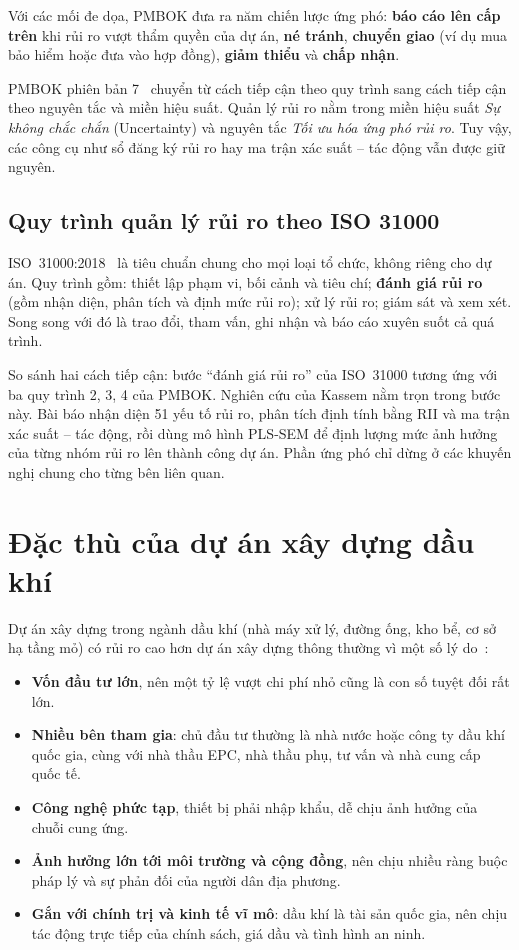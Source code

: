 Với các mối đe dọa, PMBOK đưa ra năm chiến lược ứng phó: \textbf{báo cáo lên cấp trên} khi rủi ro vượt thẩm quyền của dự án, \textbf{né tránh}, \textbf{chuyển giao} (ví dụ mua bảo hiểm hoặc đưa vào hợp đồng), \textbf{giảm thiểu} và \textbf{chấp nhận}.

PMBOK phiên bản 7~\cite{pmbok7} chuyển từ cách tiếp cận theo quy trình sang cách tiếp cận theo nguyên tắc và miền hiệu suất. Quản lý rủi ro nằm trong miền hiệu suất \emph{Sự không chắc chắn} (Uncertainty) và nguyên tắc \emph{Tối ưu hóa ứng phó rủi ro}. Tuy vậy, các công cụ như sổ đăng ký rủi ro hay ma trận xác suất -- tác động vẫn được giữ nguyên.

\subsection{Quy trình quản lý rủi ro theo ISO 31000}

ISO~31000:2018~\cite{iso31000} là tiêu chuẩn chung cho mọi loại tổ chức, không riêng cho dự án. Quy trình gồm: thiết lập phạm vi, bối cảnh và tiêu chí; \textbf{đánh giá rủi ro} (gồm nhận diện, phân tích và định mức rủi ro); xử lý rủi ro; giám sát và xem xét. Song song với đó là trao đổi, tham vấn, ghi nhận và báo cáo xuyên suốt cả quá trình.

So sánh hai cách tiếp cận: bước ``đánh giá rủi ro'' của ISO~31000 tương ứng với ba quy trình 2, 3, 4 của PMBOK. Nghiên cứu của Kassem nằm trọn trong bước này. Bài báo nhận diện 51 yếu tố rủi ro, phân tích định tính bằng RII và ma trận xác suất -- tác động, rồi dùng mô hình PLS-SEM để định lượng mức ảnh hưởng của từng nhóm rủi ro lên thành công dự án. Phần ứng phó chỉ dừng ở các khuyến nghị chung cho từng bên liên quan.

\section{Đặc thù của dự án xây dựng dầu khí}
\label{sec:dau-khi}

Dự án xây dựng trong ngành dầu khí (nhà máy xử lý, đường ống, kho bể, cơ sở hạ tầng mỏ) có rủi ro cao hơn dự án xây dựng thông thường vì một số lý do~\cite{kassem2022,thuyet2007}:
\begin{itemize}
  \item \textbf{Vốn đầu tư lớn}, nên một tỷ lệ vượt chi phí nhỏ cũng là con số tuyệt đối rất lớn.
  \item \textbf{Nhiều bên tham gia}: chủ đầu tư thường là nhà nước hoặc công ty dầu khí quốc gia, cùng với nhà thầu EPC, nhà thầu phụ, tư vấn và nhà cung cấp quốc tế.
  \item \textbf{Công nghệ phức tạp}, thiết bị phải nhập khẩu, dễ chịu ảnh hưởng của chuỗi cung ứng.
  \item \textbf{Ảnh hưởng lớn tới môi trường và cộng đồng}, nên chịu nhiều ràng buộc pháp lý và sự phản đối của người dân địa phương.
  \item \textbf{Gắn với chính trị và kinh tế vĩ mô}: dầu khí là tài sản quốc gia, nên chịu tác động trực tiếp của chính sách, giá dầu và tình hình an ninh.
\end{itemize}

